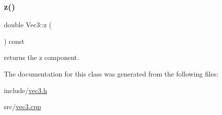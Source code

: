 \subsubsection{\texorpdfstring{z()}{z()}}
{\footnotesize\ttfamily double Vec3\+::z (\begin{DoxyParamCaption}{ }\end{DoxyParamCaption}) const\hspace{0.3cm}{\ttfamily [inline]}}



returns the z component. 



The documentation for this class was generated from the following files\+:\begin{DoxyCompactItemize}
\item 
include/\mbox{\hyperlink{vec3_8h}{vec3.\+h}}\item 
src/\mbox{\hyperlink{vec3_8cpp}{vec3.\+cpp}}\end{DoxyCompactItemize}
